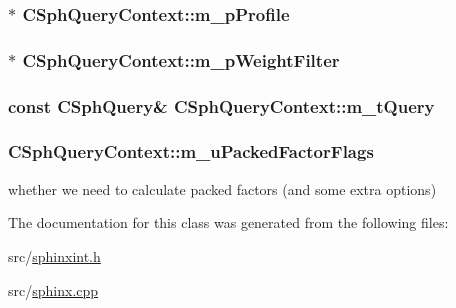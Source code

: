 \hypertarget{classCSphQueryContext_ae582e104b3365bd7fa9b729acfbca400}{
\subsubsection[{m\-\_\-p\-Profile}]{$\ast$ C\-Sph\-Query\-Context\-::m\-\_\-p\-Profile}}\label{classCSphQueryContext_ae582e104b3365bd7fa9b729acfbca400}
\hypertarget{classCSphQueryContext_a520fee85c149346a61e134802dd98987}{
\subsubsection[{m\-\_\-p\-Weight\-Filter}]{$\ast$ C\-Sph\-Query\-Context\-::m\-\_\-p\-Weight\-Filter}}\label{classCSphQueryContext_a520fee85c149346a61e134802dd98987}
\hypertarget{classCSphQueryContext_a7ae9bdda8aa24628726ebc663ba2fb5b}{
\subsubsection[{m\-\_\-t\-Query}]{\setlength{\rightskip}{0pt plus 5cm}const {\bf C\-Sph\-Query}\& C\-Sph\-Query\-Context\-::m\-\_\-t\-Query}}\label{classCSphQueryContext_a7ae9bdda8aa24628726ebc663ba2fb5b}
\hypertarget{classCSphQueryContext_ad5195a6e8fe8fe2d1dc2137842d19977}{
\subsubsection[{m\-\_\-u\-Packed\-Factor\-Flags}]{ C\-Sph\-Query\-Context\-::m\-\_\-u\-Packed\-Factor\-Flags}}\label{classCSphQueryContext_ad5195a6e8fe8fe2d1dc2137842d19977}


whether we need to calculate packed factors (and some extra options) 



The documentation for this class was generated from the following files\-:\begin{DoxyCompactItemize}
\item 
src/\hyperlink{sphinxint_8h}{sphinxint.\-h}\item 
src/\hyperlink{sphinx_8cpp}{sphinx.\-cpp}\end{DoxyCompactItemize}
